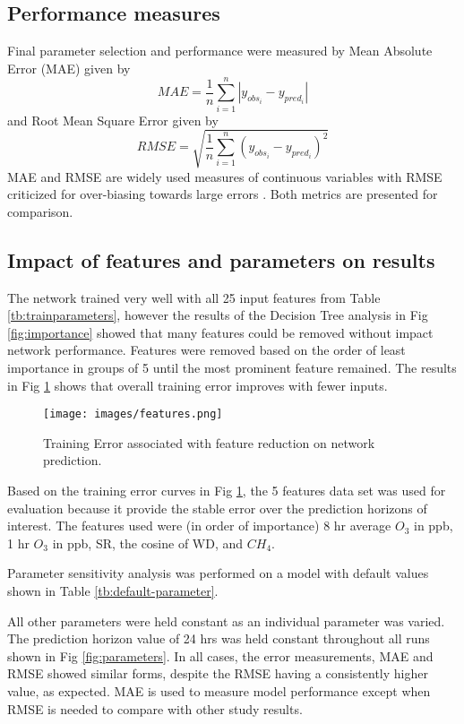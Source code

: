 \documentclass[preprint,12pt,authoryear]{elsarticle}
\begin{document}
\begin{linenumbers}
\subsection{Performance measures}

Final parameter selection and performance were measured by Mean Absolute Error (MAE) given by 
%
\begin{equation}
\label{eq:MAE}
MAE = \frac{1}{n}\sum^{n}_{i=1} \left | y_{obs_{i}}- y_{pred_{i}} \right |
\end{equation}
%
and Root Mean Square Error given by
%
\begin{equation}
\label{eq:RMSE}
RMSE = \sqrt{\frac{1}{n}\sum^{n}_{i=1} \left ( y_{obs_{i}}- y_{pred_{i}} \right )^{2}}
\end{equation}
%
MAE and RMSE are widely used measures of continuous variables with RMSE criticized for over-biasing towards large errors \citep{Chai2014, Willmott2005}. Both metrics are presented for comparison.

\subsection{Impact of features and parameters on results}

The network trained very well with all 25 input features from Table \ref{tb:trainparameters}, however the results of the Decision Tree analysis in Fig \ref{fig:importance} showed that many features could be removed without impact network performance. Features were removed based on the order of least importance in groups of 5 until the most prominent feature remained. The results in Fig \ref{fig:features} shows that overall training error improves with fewer inputs.
%
\begin{figure}[H]
\centering
\texttt{[image: images/features.png]}  %
\caption{Training Error associated with feature reduction on network prediction.}
\label{fig:features}
\end{figure}
%
Based on the training error curves in Fig \ref{fig:features}, the 5 features data set was used for evaluation because it provide the stable error over the prediction horizons of interest. The features used were (in order of importance) 8 hr average $O_{3}$ in ppb, 1 hr $O_{3}$ in ppb, SR, the cosine of WD, and $CH_{4}$.

Parameter sensitivity analysis was performed on a model with default values shown in Table \ref{tb:default-parameter}.
%

%
All other parameters were held constant as an individual parameter was varied. The prediction horizon value of 24 hrs was held constant throughout all runs shown in  Fig \ref{fig:parameters}. In all cases, the error measurements, MAE and RMSE showed similar forms, despite the RMSE having a consistently higher value, as expected. MAE is used to measure model performance except when RMSE is needed to compare with other study results.  


\end{linenumbers}
\end{document}
